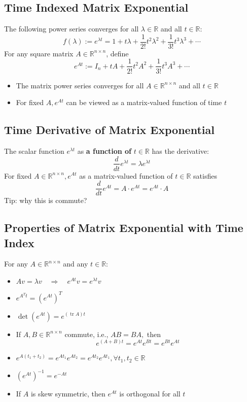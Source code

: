\documentclass[10pt,a4paper,oneside]{article}
\begin{document}
\subsection{Time Indexed Matrix Exponential}
The following power series converges for all $\lambda \in \mathbb{R}$ and all $t \in \mathbb{R}$:
\[
f(\lambda) :=e^{\lambda t}=1+t \lambda+\frac{1}{2 !} t^{2} \lambda^{2}+\frac{1}{3 !} t^{3} \lambda^{3}+\cdots
\]
For any square matrix $A\in\mathbb{R}^{n\times n}$, define
\[
e^{A t} :=I_{n}+t A+\frac{1}{2 !} t^{2} A^{2}+\frac{1}{3 !} t^{3} A^{3}+\cdots
\]
\begin{itemize}
\item The matrix power series converges for all $A \in \mathbb{R}^{n \times n}$ and all $t \in \mathbb{R}$
\item For fixed $A, e^{A t}$ can be viewed as a matrix-valued function of time $t$
\end{itemize}

\subsection{Time Derivative of Matrix Exponential}
The scalar function $e^{\lambda t}$ as \textbf{a function of} $t \in \mathbb{R}$ has the derivative:
\[
\frac{d}{d t} e^{\lambda t}=\lambda e^{\lambda t}
\]
For fixed $A \in \mathbb{R}^{n \times n}, e^{A t}$ as a matrix-valued function of $t \in \mathbb{R}$ satisfies
\[
\frac{d}{d t} e^{A t}=A \cdot e^{A t}=e^{A t} \cdot A
\]
Tip: why this is commute?

\subsection{Properties of Matrix Exponential with Time Index}
For any $A \in \mathbb{R}^{n \times n}$ and any $t \in \mathbb{R}$:
\begin{itemize}
\item $A v=\lambda v \quad \Rightarrow \quad e^{A t} v=e^{\lambda t} v$
\item $e^{A^{T} t}=\left(e^{A t}\right)^{T}$
\item $\operatorname{det}\left(e^{A t}\right)=e^{(\operatorname{tr} A) t}$
\item If $A, B \in \mathbb{R}^{n \times n}$ commute, i.e., $A B=B A,$ then
\[
e^{(A+B) t}=e^{A t} e^{B t}=e^{B t} e^{A t}
\]
\item $e^{A\left(t_{1}+t_{2}\right)}=e^{A t_{1}} e^{A t_{2}}=e^{A t_{2}} e^{A t_{1}}, \forall t_{1}, t_{2} \in \mathbb{R}$
\item $\left(e^{A t}\right)^{-1}=e^{-A t}$
\item If $A$ is skew symmetric, then $e^{A t}$ is orthogonal for all $t$
\end{itemize}
\end{document}
